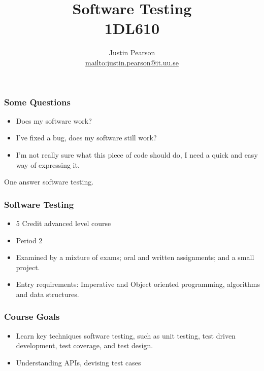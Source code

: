 \documentclass{beamer}
\begin{document}
\title{Software Testing \\ 1DL610}
\author{Justin Pearson \\ \url{mailto:justin.pearson@it.uu.se}}
\date{}
\begin{frame}
\maketitle
  
\end{frame}
\begin{frame}
  \frametitle{Some Questions}
  \begin{itemize}
  \item Does my software work?
  \item I've fixed a bug, does my software still work?
  \item I'm not really sure what this piece of code should do, I need
    a quick and easy way of expressing it.
  \end{itemize}
  One answer software testing.
\end{frame}
\begin{frame}
  \frametitle{Software Testing}
  \begin{itemize}
  \item 5 Credit advanced level course
  \item Period 2
  \item Examined by a mixture of exams; oral and written
    assignments;  and a small project.
  \item Entry requirements: Imperative and Object oriented
    programming, algorithms and data structures. %
  \end{itemize}
\end{frame}
\begin{frame}
  \frametitle{Course Goals}
  \begin{itemize}
  \item Learn key techniques  software testing, such as unit testing,
    test driven development, test coverage,  and test design.
  \item Understanding APIs, devising test cases 
  \end{itemize}
\end{frame}
\end{document}
